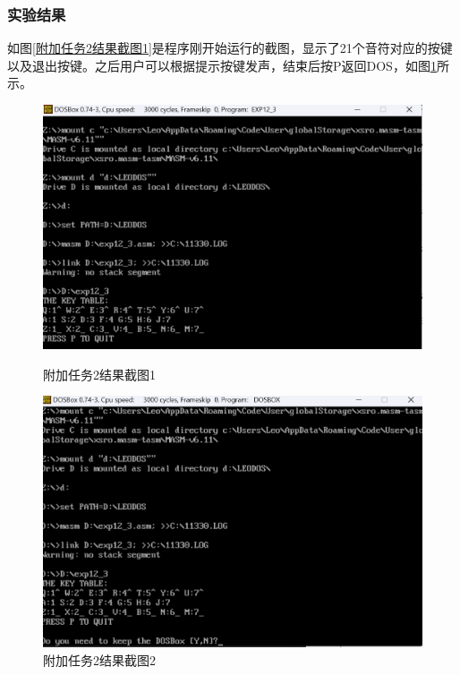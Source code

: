 \documentclass[12pt, a4paper, oneside]{ctexart}
\begin{document}
\subsubsection{实验结果}
如图\ref{附加任务2结果截图1}是程序刚开始运行的截图，显示了21个音符对应的按键以及退出按键。之后用户可以根据提示按键发声，结束后按P返回DOS，如图\ref{附加任务2结果截图2}所示。
\begin{figure}[H]
    \centering
    \begin{minipage}{0.45\textwidth}
    \centering
    \includegraphics[scale=0.40]{pic/exp12-3-1.png}
    \caption{附加任务2结果截图1}
    \label{附加任务2结果截图1}
    \end{minipage}
    \hspace{0.05\textwidth}
    \begin{minipage}{0.45\textwidth}
    \centering
    \includegraphics[scale=0.40]{pic/exp12-3-2.png}
    \caption{附加任务2结果截图2}
    \label{附加任务2结果截图2}
    \end{minipage}
\end{figure}
\end{document}
